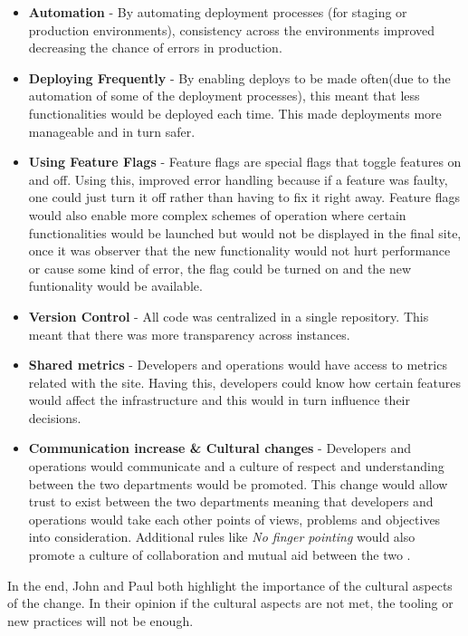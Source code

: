         \begin{itemize}
          \item \textbf{Automation} - By automating deployment processes (for staging or production environments), consistency across the environments improved decreasing the chance of errors in production.
          \item \textbf{Deploying Frequently} - By enabling deploys to be made often(due to the automation of some of the deployment processes), this meant that less functionalities would be deployed each time. This made deployments more manageable and in turn safer.
          \item \textbf{Using Feature Flags} - Feature flags are special flags that toggle features on and off. Using this, improved error handling because if a feature was faulty, one could just turn it off rather than having to fix it right away. Feature flags would also enable more complex schemes of operation where certain functionalities would be launched but would not be displayed in the final site, once it was observer that the new functionality would not hurt performance or cause some kind of error, the flag could be turned on and the new funtionality would be available.
          \item \textbf{Version Control} - All code was centralized in a single repository. This meant that there was more transparency across instances.
          \item \textbf{Shared metrics} - Developers and operations would have access to metrics related with the site. Having this, developers could know how certain features would affect the infrastructure and this would in turn influence their decisions.
          \item \textbf{Communication increase \& Cultural changes} - Developers and operations would communicate and a culture of respect and understanding between the two departments would be promoted. This change would allow trust to exist between the two departments meaning that developers and operations would take each other points of views, problems and objectives into consideration. Additional rules like \textit{No finger pointing} would also promote a culture of collaboration and mutual aid between the two .
        \end{itemize}

      In the end, John and Paul both highlight the importance of the cultural aspects of the change. In their opinion if the cultural aspects are not met, the tooling or new practices will not be enough.

